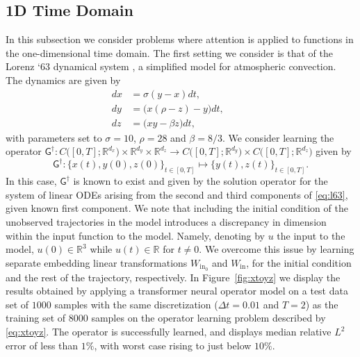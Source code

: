 \documentclass[twoside]{article}
\newcommand{\1}{\mathbbm{1}}
\newcommand{\R}{\mathbbm{R}}
\newcommand{\sG}{\mathsf{G}}
\providecommand{\mathbbm}{\mathbb} %
\begin{document}
\subsection{1D Time Domain}
\label{subsec:1d_experiments}
In this subsection we consider problems where attention is applied to functions in the one-dimensional time domain. The first setting we consider is that of the Lorenz `63 dynamical system \citep{lorenz1963deterministic}, a simplified model for atmospheric convection. The dynamics are given by 
\begin{equation}\label{eq:l63}
\begin{alignedat}{2}
   {dx} &= \sigma (y - x){dt}, &\quad& \\
    {dy} &= \bigl(x (\rho - z) - y\bigr){dt}, && \\
    {dz} &= \bigl(xy - \beta z \bigr){dt},&&
\end{alignedat}
\tag{Lorenz `63}
\end{equation}
with parameters set to $\sigma=10$, $\rho=28$ and $\beta=8/3$. We consider learning the operator $\sG^\dagger:C\bigl([0,T];\R^{d_x} \bigr)\times \R^{d_y}\times \R^{d_z}\to C\bigl([0,T];\R^{d_y} \bigr)\times C\bigl([0,T];\R^{d_z} \bigr)$ given by 
\begin{equation}
\label{eq:xtoyz}
\sG^\dagger:\{x(t),y(0),z(0)\}_{t\in{[0,T]}} \mapsto \{y(t),z(t)\}_{t\in{[0,T]}}.
\end{equation}
In this case, $\sG^\dagger$ is known to exist and given by the solution operator for the system of linear ODEs arising from the second and third components of \eqref{eq:l63}, given known first component. We note that including the initial condition of the unobserved trajectories in the model introduces a discrepancy in dimension within the input function to the model. Namely, denoting by $u$ the input to the model, $u(0)\in \R^{3}$ while $u(t)\in \R$ for $t\neq 0$. We overcome this issue by learning separate embedding linear transformations $W_{\textrm{in}_0}$ and $W_{\textrm{in}}$, for the initial condition and the rest of the trajectory, respectively. In Figure~\ref{fig:xtoyz} we display the results obtained by applying a transformer neural operator model on a test data set of $1000$ samples with the same discretization ($\Delta t=0.01$ and $T=2$) as the training set of $8000$ samples on the operator learning problem described by \eqref{eq:xtoyz}. The operator is successfully learned, and displays median relative $L^2$ error of less than $1\%$, with worst case rising to just below $10\%.$
\end{document}
